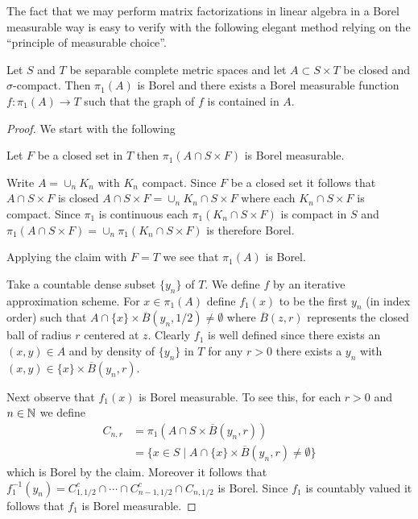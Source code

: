 The fact that we may perform matrix factorizations in linear algebra in a Borel measurable way is easy to verify with the following elegant method relying on the ``principle of measurable choice''.
\begin{thm}\label{PrincipleOfMeasurableChoice}Let $S$ and $T$ be separable complete metric spaces and let $A \subset S \times T$ be closed and $\sigma$-compact.  Then $\pi_1(A)$ is Borel and there exists a Borel measurable function $f : \pi_1(A) \to T$ such that the graph of $f$ is contained in $A$.
\end{thm}
\begin{proof}
We start with the following
\begin{clm}Let $F$ be a closed set in $T$ then $\pi_1(A \cap S\times F)$ is Borel measurable.
\end{clm}
Write $A = \cup_n K_n$ with $K_n$ compact.  Since $F$ be a closed set it follows that $A \cap S\times F$ is closed $A \cap S\times F =  \cup_n K_n \cap S \times F$ where each $K_n \cap S \times F$ is compact.  Since $\pi_1$ is continuous each $\pi_1 (K_n \cap S \times F)$ is compact in $S$ and $\pi_1 (A \cap S\times F) = \cup_n \pi_1(K_n \cap S \times F)$ is therefore Borel.  

Applying the claim with $F = T$ we see that $\pi_1(A)$ is Borel.

Take a countable dense subset $\lbrace y_n \rbrace$ of $T$.  We define $f$ by an iterative approximation scheme.  
For $x \in \pi_1(A)$ define $f_1(x)$ to be the first $y_n$ (in index order) such that $A \cap \lbrace x \rbrace \times \overline{B}(y_n, 1/2) \neq \emptyset$ where $\overline{B}(z,r)$ represents the closed ball of radius $r$ centered at $z$.  Clearly $f_1$ is well defined since there exists an $(x,y) \in A$ and by density of $\lbrace y_n \rbrace$ in $T$ for any $r > 0$ there exists a $y_n$ with $(x,y) \in \lbrace x \rbrace \times \overline{B}(y_n,r)$.

Next observe that $f_1(x)$ is Borel measurable.  To see this, for each $r > 0$ and $n \in \mathbb{N}$ we define 
\begin{align*}
C_{n,r} &= \pi_1(A \cap S \times \overline{B}(y_n,r) )\\
&= \lbrace x \in S \mid A \cap \lbrace x \rbrace \times \overline{B}(y_n,r) \neq \emptyset \rbrace
\end{align*}
which is Borel by the claim.  Moreover it follows that $f_1^{-1}(y_n) = C_{1, 1/2}^c \cap \dotsb \cap C_{n-1, 1/2}^c \cap C_{{n}, 1/2}$ is Borel.  Since $f_1$ is countably valued it follows that $f_1$ is Borel measurable.


\end{proof}
